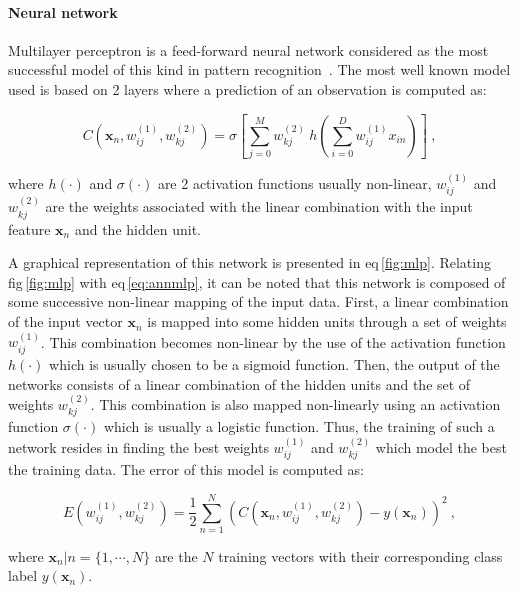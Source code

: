 \paragraph{Neural network} 
Multilayer perceptron is a feed-forward neural network considered as the most successful model of this kind in pattern recognition~\cite{Bishop2006}.
The most well known model used is based on 2 layers where a prediction of an observation is computed as:

\begin{equation}
	C(\mathbf{x}_n,w_{ij}^{(1)},w_{kj}^{(2)}) = \sigma \left[ \sum_{j=0}^{M} w_{kj}^{(2)} \  h \left( \sum_{i=0}^{D} w_{ij}^{(1)} x_{in} \right) \right] \ ,
	\label{eq:annmlp}
\end{equation}

\noindent where $h(\cdot)$ and $\sigma(\cdot)$ are 2 activation functions usually non-linear, $w_{ij}^{(1)}$ and $ w_{kj}^{(2)}$ are the weights associated with the linear combination with the input feature $\mathbf{x}_n$ and the hidden unit.



A graphical representation of this network is presented in \acs{eq}\,\ref{fig:mlp}.
Relating \acs{fig}\,\ref{fig:mlp} with \acs{eq}\,\eqref{eq:annmlp}, it can be noted that this network is composed of some successive non-linear mapping of the input data.
First, a linear combination of the input vector $\mathbf{x}_n$ is mapped into some hidden units through a set of weights $w_{ij}^{(1)}$.
This combination becomes non-linear by the use of the activation function $h(\cdot)$ which is usually chosen to be a sigmoid function.
Then, the output of the networks consists of a linear combination of the hidden units and the set of weights $w_{kj}^{(2)}$.
This combination is also mapped non-linearly using an activation function $\sigma(\cdot)$ which is usually a logistic function.
Thus, the training of such a network resides in finding the best weights $w_{ij}^{(1)}$ and $ w_{kj}^{(2)}$ which model the best the training data.
The error of this model is computed as:

\begin{equation}
	E(w_{ij}^{(1)},w_{kj}^{(2)}) = \frac{1}{2} \sum_{n=1}^{N} \left( C(\mathbf{x}_n,w_{ij}^{(1)},w_{kj}^{(2)}) - y(\mathbf{x}_n) \right) ^{2} \ ,
	\label{eq:mlpcost}
\end{equation}

\noindent where $\mathbf{x}_n|n=\{1,\cdots,N\}$ are the $N$ training vectors with their corresponding class label $y(\mathbf{x}_n)$.

